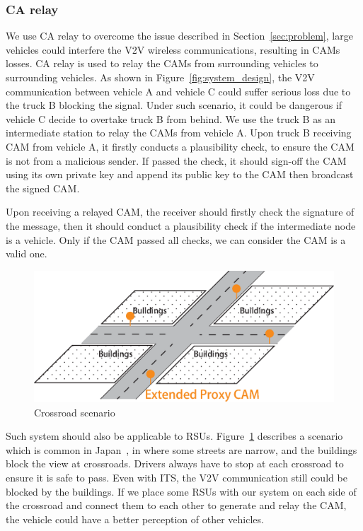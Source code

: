 \subsubsection{CA relay}

We use CA relay to overcome the issue described in Section~\ref{sec:problem},
large vehicles could interfere the V2V wireless communications, resulting in CAMs losses.
CA relay is used to relay the CAMs from surrounding vehicles to surrounding vehicles.
As shown in Figure~\ref{fig:system_design},
the V2V communication between vehicle A and vehicle C could suffer serious loss due to the truck B blocking the signal.
Under such scenario, it could be dangerous if vehicle C decide to overtake truck B from behind.
We use the truck B as an intermediate station to relay the CAMs from vehicle A.
Upon truck B receiving CAM from vehicle A, it firstly conducts a plausibility check,
to ensure the CAM is not from a malicious sender.
If passed the check,
it should sign-off the CAM using its own private key and append its public key to the CAM then broadcast the signed CAM.

Upon receiving a relayed CAM, the receiver should firstly check the signature of the message,
then it should conduct a plausibility check if the intermediate node is a vehicle.
Only if the CAM passed all checks, we can consider the CAM is a valid one.

\begin{figure}[htbp]
    \begin{center}
        \includegraphics[width=0.85\linewidth]{figures/crossroad.eps}
        \caption{Crossroad scenario}
        \label{fig:crossroad}
    \end{center}
\end{figure}

Such system should also be applicable to RSUs.
Figure~\ref{fig:crossroad} describes a scenario which is common in Japan~\cite{tsugawa2011current},
in where some streets are narrow, and the buildings block the view at crossroads.
Drivers always have to stop at each crossroad to ensure it is safe to pass.
Even with ITS, the V2V communication still could be blocked by the buildings.
If we place some RSUs with our system on each side of the crossroad and connect them to each other to generate and relay the CAM,
the vehicle could have a better perception of other vehicles.

